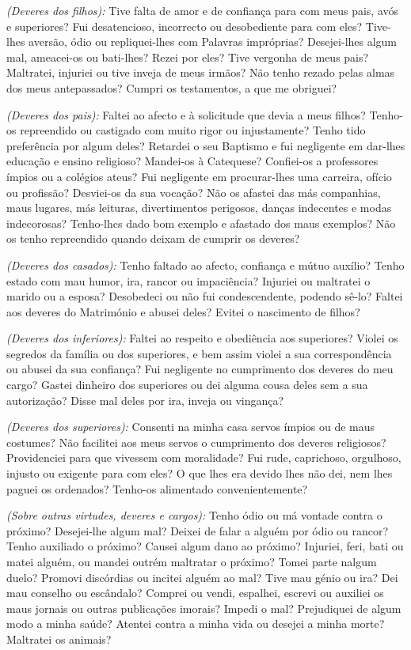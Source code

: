 \emph{(Deveres dos filhos):} Tive falta de amor e de confiança para com meus pais, avós e superiores? Fui desatencioso, incorrecto ou desobediente para com eles? Tive-lhes aversão, ódio ou repliquei-lhes com Palavras impróprias? Desejei-lhes algum mal, ameacei-os ou bati-lhes? Rezei por eles? Tive vergonha de meus pais? Maltratei, injuriei ou tive inveja de meus irmãos? Não tenho rezado pelas almas dos meus antepassados? Cumpri os testamentos, a que me obriguei?

\emph{(Deveres dos pais):} Faltei ao afecto e à solicitude que devia a meus filhos? Tenho-os repreendido ou castigado com muito rigor ou injustamente? Tenho tido preferência por algum deles? Retardei o seu Baptismo e fui negligente em dar-lhes educação e ensino religioso? Mandei-os à Catequese? Confiei-os a professores ímpios ou a colégios ateus? Fui negligente em procurar-lhes uma carreira, ofício ou profissão? Desviei-os da sua vocação? Não os afastei das más companhias, maus lugares, más leituras, divertimentos perigosos, danças indecentes e modas indecorosas? Tenho-lhcs dado bom exemplo e afastado dos maus exemplos? Não os tenho repreendido quando deixam de cumprir os deveres?

\emph{(Deveres dos casados):} Tenho faltado ao afecto, confiança e mútuo auxílio? Tenho estado com mau humor, ira, rancor ou impaciência? Injuriei ou maltratei o marido ou a esposa? Desobedeci ou não fui condescendente, podendo sê-lo? Faltei aos deveres do Matrimónio e abusei deles? Evitei o nascimento de filhos?

\emph{(Deveres dos inferiores):} Faltei ao respeito e obediência aos superiores? Violei os segredos da família ou dos superiores, e bem assim violei a sua correspondência ou abusei da sua confiança? Fui negligente no cumprimento dos deveres do meu cargo? Gastei dinheiro dos superiores ou dei alguma cousa deles sem a sua autorização? Disse mal deles por ira, inveja ou vingança?

\emph{(Deveres dos superiores):} Consenti na minha casa servos ímpios ou de maus costumes? Não facilitei aos meus servos o cumprimento dos deveres religiosos? Providenciei para que vivessem com moralidade? Fui rude, caprichoso, orgulhoso, injusto ou exigente para com eles? O que lhes era devido lhes não dei, nem lhes paguei os ordenados? Tenho-os alimentado convenientemente?

\emph{(Sobre outras virtudes, deveres e cargos):} Tenho ódio ou má vontade contra o próximo? Desejei-lhe algum mal? Deixei de falar a alguém por ódio ou rancor? Tenho auxiliado o próximo? Causei algum dano ao próximo? Injuriei, feri, bati ou matei alguém, ou mandei outrém maltratar o próximo? Tomei parte nalgum duelo? Promovi discórdias ou incitei alguém ao mal? Tive mau génio ou ira? Dei mau conselho ou escândalo? Comprei ou vendi, espalhei, escrevi ou auxiliei os maus jornais ou outras publicações imorais? Impedi o mal? Prejudiquei de algum modo a minha saúde? Atentei contra a minha vida ou desejei a minha morte? Maltratei os animais?

